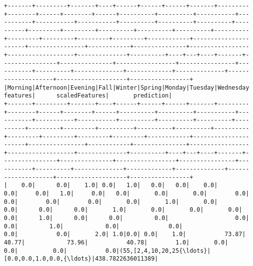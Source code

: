 \documentclass[11pt]{article}
\begin{document}
    \begin{Verbatim}[commandchars=\\\{\}]
+-------+---------+-------+----+------+------+------+-------+---------+--------+------+--------+------+----------+----------+-----------+-----------+-----------+-----------+----------+----------+----------+----------+---------+---------+----------+----------+----------+----------+---------+---------+---------+---------+------------+----------------------+----------------+------------+---------------+-----------------+-------------------+--------------+----------+----+---+----+-------+----------------+---------------+-----------------+----------------+-----------+----------+--------------+-------------+--------------+--------------------+--------------------+-----------------+
|Morning|Afternoon|Evening|Fall|Winter|Spring|Monday|Tuesday|Wednesday|Thursday|Friday|Saturday|Sunday|dropoff\_cc|dropoff\_GM|dropoff\_ues|dropoff\_Gvs|dropoff\_Uws|dropoff\_Les|dropoff\_Lm|dropoff\_Wq|dropoff\_Nb|dropoff\_ch|Pickup\_cc|Pickup\_GM|Pickup\_ues|Pickup\_Gvs|Pickup\_Uws|Pickup\_Les|Pickup\_Lm|Pickup\_Wq|Pickup\_Nb|Pickup\_Nq|VendorID\_1\_0|store\_and\_fwd\_flag\_1\_0|RateCode\_stdrate|RateCode\_JFK|RateCode\_Newark|RateCode\_Nassau\_W|RateCode\_Negotiated|RateCode\_Group|avg\_temp\_C|Rain|Fog|Snow|Holiday|pickup\_longitude|pickup\_latitude|dropoff\_longitude|dropoff\_latitude|ptype\_CCard|ptype\_cash|ptype\_nocharge|ptype\_dispute|ptype\_voidtrip|            features|      scaledFeatures|       prediction|
+-------+---------+-------+----+------+------+------+-------+---------+--------+------+--------+------+----------+----------+-----------+-----------+-----------+-----------+----------+----------+----------+----------+---------+---------+----------+----------+----------+----------+---------+---------+---------+---------+------------+----------------------+----------------+------------+---------------+-----------------+-------------------+--------------+----------+----+---+----+-------+----------------+---------------+-----------------+----------------+-----------+----------+--------------+-------------+--------------+--------------------+--------------------+-----------------+
|    0.0|      0.0|    1.0| 0.0|   1.0|   0.0|   0.0|    0.0|      0.0|     0.0|   1.0|     0.0|   0.0|       0.0|       0.0|        0.0|        0.0|        0.0|        0.0|       0.0|       1.0|       0.0|       0.0|      0.0|      0.0|       1.0|       0.0|       0.0|       0.0|      0.0|      1.0|      0.0|      0.0|         0.0|                   0.0|             0.0|         1.0|            0.0|              0.0|                0.0|           0.0|       2.0| 1.0|0.0| 0.0|    1.0|           73.87|          40.77|            73.96|           40.78|        1.0|       0.0|           0.0|          0.0|           0.0|(55,[2,4,10,20,25{\ldots}|[0.0,0.0,1.0,0.0,{\ldots}|438.7822636011389|

\end{Verbatim}
\end{document}
